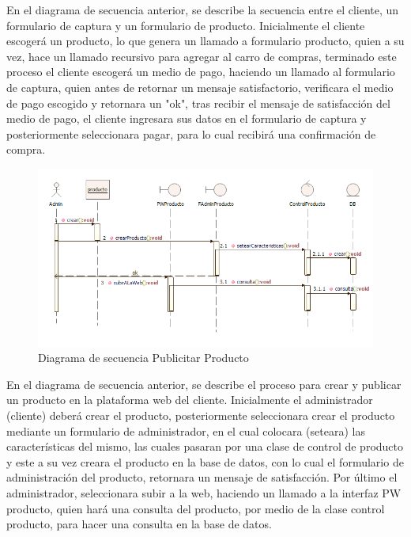 En el diagrama de secuencia anterior, se describe la secuencia entre el cliente, un formulario de captura y un formulario de producto. Inicialmente el cliente escogerá un producto, lo que genera un llamado a formulario producto, quien a su vez, hace un llamado recursivo para agregar al carro de compras, terminado este proceso el cliente escogerá un medio de pago, haciendo un llamado al formulario de captura, quien antes de retornar un mensaje satisfactorio, verificara el medio de pago escogido y retornara un "ok", tras recibir el mensaje de satisfacción del medio de pago, el cliente ingresara sus datos en el formulario de captura y posteriormente seleccionara pagar, para lo cual recibirá una confirmación de compra.


\newpage
\begin{figure}[th!]
	\centering
	\includegraphics[width=1.0\linewidth]{arquitectura/imagenes/DiagramaDeSecuenciaPP}
	\caption{Diagrama de secuencia Publicitar Producto}
\end{figure}
En el diagrama de secuencia anterior, se describe el proceso para crear y publicar un producto en la plataforma web del cliente. Inicialmente el administrador (cliente) deberá crear el producto, posteriormente seleccionara crear el producto mediante un formulario de administrador, en el cual colocara (seteara) las características del mismo, las cuales pasaran por una clase de control de producto y este a su vez creara el producto en la base de datos, con lo cual el formulario de administración del producto, retornara un mensaje de satisfacción. Por último el administrador, seleccionara subir a la web, haciendo un llamado a la interfaz PW producto, quien hará una consulta del producto, por medio de la clase control producto, para hacer una consulta en la base de datos.

